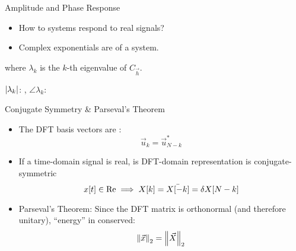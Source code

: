 \begin{frame}{Amplitude and Phase Response}
  \begin{itemize}
    \item How to systems respond to real signals?
    \item Complex exponentials are  of a system.
  \end{itemize}

  where $\lambda_k$ is the $k$-th eigenvalue of $C_{\vec{h}}$.

  $\abs{\lambda_k}$: , $\angle \lambda_k$: 
\end{frame}

\begin{frame}{Conjugate Symmetry \& Parseval's Theorem}
  \begin{itemize}
    \item The DFT basis vectors are :
      \begin{equation*}
        \vec{u}_k = \vec{u}_{N-k}^*
      \end{equation*}
    \item If a time-domain signal is real, is DFT-domain representation is conjugate-symmetric
      \begin{equation*}
        x[t] \in \Re \implies X[k] = \bar{X[-k]} = \var{X[N-k]}
      \end{equation*}
    \item Parseval's Theorem: Since the DFT matrix is orthonormal (and therefore unitary), ``energy'' in conserved:
      \begin{equation*}
        \norm{\vec{x}}_2 = \norm{\vec{X}}_2
      \end{equation*}
  \end{itemize}
\end{frame}

